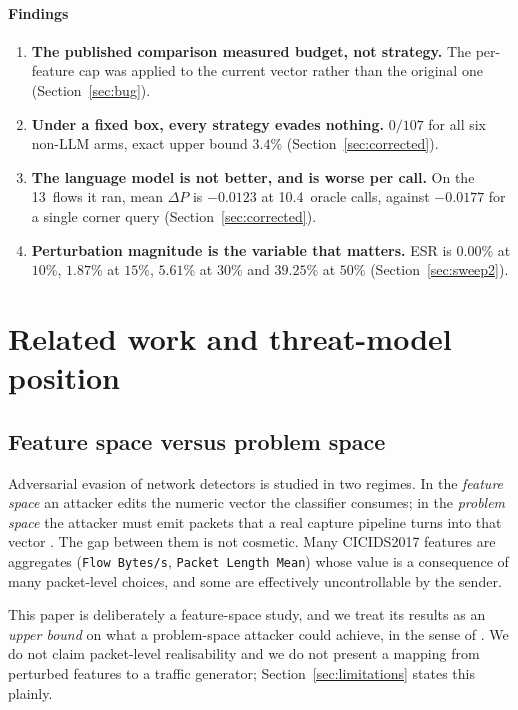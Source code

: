 \documentclass[journal]{IEEEtran}
\providecommand{\citep}[1]{\cite{#1}}
\providecommand{\citet}[1]{\cite{#1}}
\theoremstyle{definition}
\newcommand{\CN}{107}
\newcommand{\CCPhi}{3.4}
\newcommand{\CGreedyEv}{0}
\newcommand{\CLlmCalls}{10.4}
\newcommand{\CSubCornerDp}{-0.0177}
\newcommand{\CSubLlmDp}{-0.0123}
\newcommand{\CSubN}{13}
\newcommand{\CEsrB}{0.00}
\newcommand{\CEsrC}{1.87}
\newcommand{\CEsrE}{5.61}
\newcommand{\CEsrF}{39.25}
\begin{document}
\paragraph{Findings}
\begin{enumerate}
\item \textbf{The published comparison measured budget, not strategy.} The
per-feature cap was applied to the current vector rather than the original one
(Section~\ref{sec:bug}).
\item \textbf{Under a fixed box, every strategy evades nothing.}
$\CGreedyEv/\CN$ for all six non-LLM arms, exact upper bound $\CCPhi$\%
(Section~\ref{sec:corrected}).
\item \textbf{The language model is not better, and is worse per call.} On the
\CSubN\ flows it ran, mean $\Delta P$ is $\CSubLlmDp$ at \CLlmCalls\ oracle
calls, against $\CSubCornerDp$ for a single corner query
(Section~\ref{sec:corrected}).
\item \textbf{Perturbation magnitude is the variable that matters.} ESR is
$\CEsrB$\% at $10$\%, $\CEsrC$\% at $15$\%, $\CEsrE$\% at $30$\% and
$\CEsrF$\% at $50$\% (Section~\ref{sec:sweep2}).
\end{enumerate}


\section{Related work and threat-model position}
\label{sec:related}

\subsection{Feature space versus problem space}
Adversarial evasion of network detectors is studied in two regimes. In the
\emph{feature space} an attacker edits the numeric vector the classifier
consumes; in the \emph{problem space} the attacker must emit packets that a real
capture pipeline turns into that vector \citep{pierazzi2020problemspace}. The
gap between them is not cosmetic. Many CICIDS2017 features are aggregates
(\texttt{Flow Bytes/s}, \texttt{Packet Length Mean}) whose value is a
consequence of many packet-level choices, and some are effectively
uncontrollable by the sender.

This paper is deliberately a feature-space study, and we treat its results as an
\emph{upper bound} on what a problem-space attacker could achieve, in the sense
of \citet{apruzzese2022modeling}. We do not claim packet-level realisability
and we do not present a mapping from perturbed features to a traffic generator;
Section~\ref{sec:limitations} states this plainly.
\end{document}
